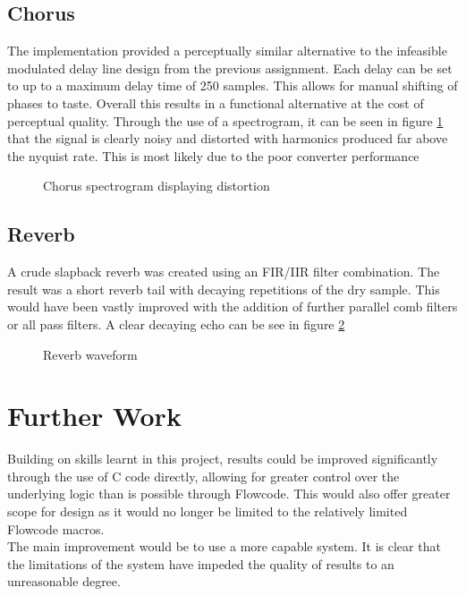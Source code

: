 \documentclass[titlepage]{scrartcl}
\begin{document}
        \subsection{Chorus}
        The implementation provided a perceptually similar alternative to the
        infeasible modulated delay line design from the previous assignment.
        Each delay can be set to up to a maximum delay time of 250 samples.
        This allows for manual shifting of phases to taste. Overall this
        results in a functional alternative at the cost of perceptual quality.
        Through the use of a spectrogram, it can be seen in figure
        \ref{fig:cho_spec} that the signal is clearly noisy and distorted with
        harmonics produced far above the nyquist rate. This is most likely due
        to the poor converter performance
        \begin{figure}[H]
            \caption{Chorus spectrogram displaying distortion}
            \label{fig:cho_spec}
        \end{figure}

        \subsection{Reverb}
        A crude slapback reverb was created using an FIR/IIR filter
        combination. The result was a short reverb tail with decaying
        repetitions of the dry sample. This would have been vastly improved
        with the addition of further parallel comb filters or all pass filters.
        A clear decaying echo can be see in figure \ref{fig:rev_wav}

        \begin{figure}[H]
            \caption{Reverb waveform}
            \label{fig:rev_wav}
        \end{figure}
        
    \section{Further Work}
    Building on skills learnt in this project, results could be improved
    significantly through the use of C code directly, allowing for greater
    control over the underlying logic than is possible through Flowcode. This
    would also offer greater scope for design as it would no longer be limited
    to the relatively limited Flowcode macros.\\
    The main improvement would be to use a more capable system. It is clear
    that the limitations of the system have impeded the quality of results to
    an unreasonable degree. 
\end{document}
